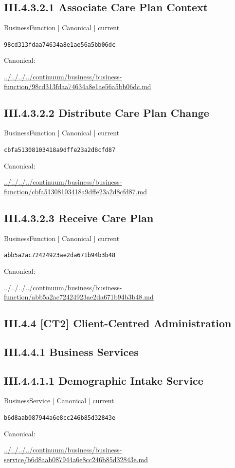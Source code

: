 \documentclass[10pt,a4paper]{article}
\begin{document}
\subsection*{III.4.3.2.1 Associate Care Plan Context}
{\small BusinessFunction | Canonical | current}\par
\texttt{98cd313fdaa74634a8e1ae56a5bb06dc}\par
Canonical: \par
{\footnotesize\url{../../../../continuum/business/business-function/98cd313fdaa74634a8e1ae56a5bb06dc.md}}\par
\subsection*{III.4.3.2.2 Distribute Care Plan Change}
{\small BusinessFunction | Canonical | current}\par
\texttt{cbfa51308103418a9dffe23a2d8cfd87}\par
Canonical: \par
{\footnotesize\url{../../../../continuum/business/business-function/cbfa51308103418a9dffe23a2d8cfd87.md}}\par
\subsection*{III.4.3.2.3 Receive Care Plan}
{\small BusinessFunction | Canonical | current}\par
\texttt{abb5a2ac72424923ae2da671b94b3b48}\par
Canonical: \par
{\footnotesize\url{../../../../continuum/business/business-function/abb5a2ac72424923ae2da671b94b3b48.md}}\par
\subsection*{III.4.4 [CT2] Client-Centred Administration}
\subsection*{III.4.4.1 Business Services}
\subsection*{III.4.4.1.1 Demographic Intake Service}
{\small BusinessService | Canonical | current}\par
\texttt{b6d8aab087944a6e8cc246b85d32843e}\par
Canonical: \par
{\footnotesize\url{../../../../continuum/business/business-service/b6d8aab087944a6e8cc246b85d32843e.md}}\par
\end{document}
